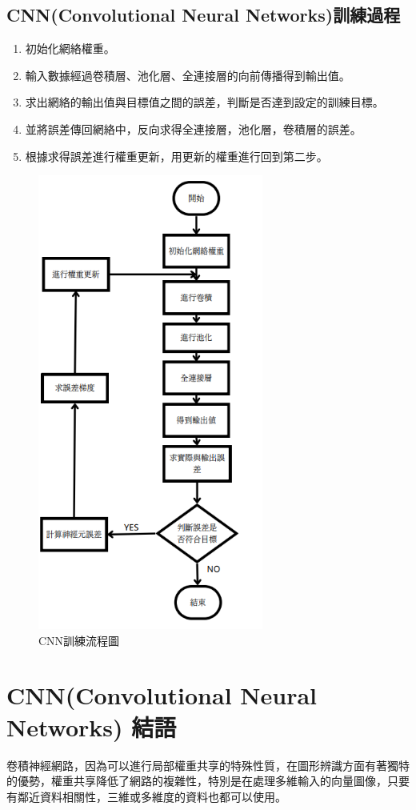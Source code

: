 \subsection{CNN(Convolutional Neural Networks)訓練過程}
\begin{enumerate}
	\item
	      初始化網絡權重。
	\item
	      輸入數據經過卷積層、池化層、全連接層的向前傳播得到輸出值。
	\item
	      求出網絡的輸出值與目標值之間的誤差，判斷是否達到設定的訓練目標。
	\item
	      並將誤差傳回網絡中，反向求得全連接層，池化層，卷積層的誤差。
	\item
	      根據求得誤差進行權重更新，用更新的權重進行回到第二步。
\end{enumerate}
\begin{figure}[H]
	\centerline{\includegraphics[height=15cm]{pic/CNNp.PNG}}
	\caption{CNN訓練流程圖}
	\label{fig:this_system}
\end{figure}
\section{CNN(Convolutional Neural Networks) 結語}
卷積神經網路，因為可以進行局部權重共享的特殊性質，在圖形辨識方面有著獨特的優勢，權重共享降低了網路的複雜性，特別是在處理多維輸入的向量圖像，只要有鄰近資料相關性，三維或多維度的資料也都可以使用。
